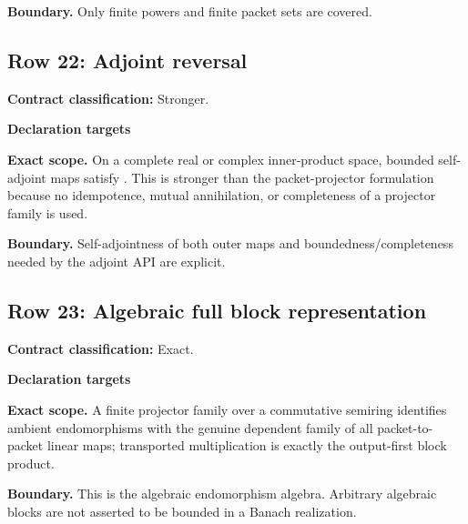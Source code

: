 \par\smallskip\noindent\textbf{Boundary.} Only finite powers and finite packet sets are covered.
\medskip
{}\subsection{Row 22: Adjoint reversal}
\label{row:22}
\textbf{Contract classification:} Stronger.
\par\smallskip\textbf{Declaration targets}\par
{\small\noindent{}\par}
\medskip\noindent\textbf{Exact scope.} On a complete real or complex inner-product space, bounded self-adjoint maps satisfy . This is stronger than the packet-projector formulation because no idempotence, mutual annihilation, or completeness of a projector family is used.
\par\smallskip\noindent\textbf{Boundary.} Self-adjointness of both outer maps and boundedness/completeness needed by the adjoint API are explicit.
\medskip
{}\subsection{Row 23: Algebraic full block representation}
\label{row:23}
\textbf{Contract classification:} Exact.
\par\smallskip\textbf{Declaration targets}\par
{\small\noindent{}\par}
{\small\noindent{}\par}
{\small\noindent{}\par}
{\small\noindent{}\par}
\medskip\noindent\textbf{Exact scope.} A finite projector family over a commutative semiring identifies ambient endomorphisms with the genuine dependent family of all packet-to-packet linear maps; transported multiplication is exactly the output-first block product.
\par\smallskip\noindent\textbf{Boundary.} This is the algebraic endomorphism algebra. Arbitrary algebraic blocks are not asserted to be bounded in a Banach realization.
